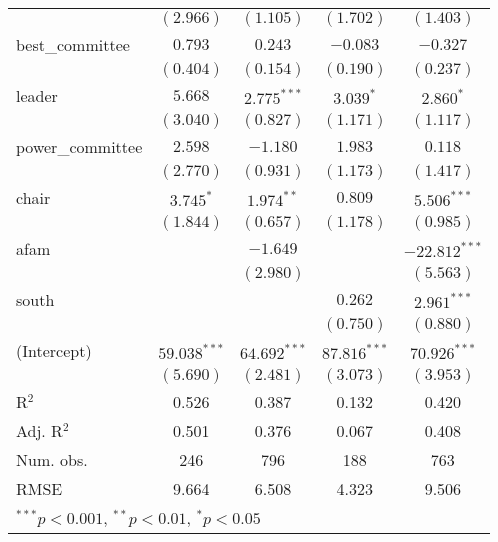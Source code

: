 \documentclass[12pt]{article}
\begin{document}
\begin{table}[H]
\begin{center}
\begin{tabular}{l c c c c }
			& $(2.966)$      & $(1.105)$      & $(1.702)$      & $(1.403)$       \\
			best\_committee        & $0.793$        & $0.243$        & $-0.083$       & $-0.327$        \\
			& $(0.404)$      & $(0.154)$      & $(0.190)$      & $(0.237)$       \\
			leader                 & $5.668$        & $2.775^{***}$  & $3.039^{*}$    & $2.860^{*}$     \\
			& $(3.040)$      & $(0.827)$      & $(1.171)$      & $(1.117)$       \\
			power\_committee       & $2.598$        & $-1.180$       & $1.983$        & $0.118$         \\
			& $(2.770)$      & $(0.931)$      & $(1.173)$      & $(1.417)$       \\
			chair                  & $3.745^{*}$    & $1.974^{**}$   & $0.809$        & $5.506^{***}$   \\
			& $(1.844)$      & $(0.657)$      & $(1.178)$      & $(0.985)$       \\
			afam                   &                & $-1.649$       &                & $-22.812^{***}$ \\
			&                & $(2.980)$      &                & $(5.563)$       \\
			south                  &                &                & $0.262$        & $2.961^{***}$   \\
			&                &                & $(0.750)$      & $(0.880)$       \\
			(Intercept)            & $59.038^{***}$ & $64.692^{***}$ & $87.816^{***}$ & $70.926^{***}$  \\
			& $(5.690)$      & $(2.481)$      & $(3.073)$      & $(3.953)$       \\
			\hline
			R$^2$                  & 0.526          & 0.387          & 0.132          & 0.420           \\
			Adj. R$^2$             & 0.501          & 0.376          & 0.067          & 0.408           \\
			Num. obs.              & 246            & 796            & 188            & 763             \\
			RMSE                   & 9.664          & 6.508          & 4.323          & 9.506           \\
			\hline
			\multicolumn{5}{l}{\scriptsize{$^{***}p<0.001$, $^{**}p<0.01$, $^*p<0.05$}}
		\end{tabular}
	\end{center}
\end{table}
\end{document}
